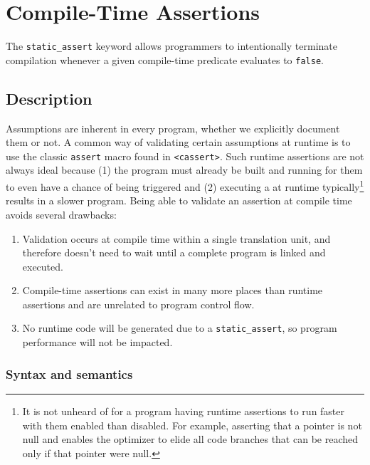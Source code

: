 \newpage
\section[{\tt static\_assert}]{Compile-Time Assertions}\label{compile-time-assertions-(static_assert)}



The \lstinline!static_assert! keyword allows programmers to intentionally terminate compilation whenever a given compile-time predicate
 evaluates to \lstinline!false!.

\subsection[Description]{Description}\label{description}

Assumptions are
inherent in every program, whether we explicitly document them or not. A common way of validating certain
assumptions at runtime is to use the classic \lstinline!assert! macro found
in \lstinline!<cassert>!. Such runtime assertions are not always ideal
because (1) the program must already be built and running for them to
even have a chance of being triggered and (2) executing a
 at runtime typically{\cprotect\footnote{It is
not unheard of for a program having runtime assertions to run faster with them
enabled than disabled. For example, asserting that a pointer is not
null and enables the optimizer to elide all code branches that
  can be reached only if that pointer were null.}} results in a slower
program. Being able to validate an assertion at compile time avoids
several drawbacks:

\begin{enumerate}
\item{Validation occurs at compile time within a single translation unit, and therefore doesn’t need to wait until a complete program is linked and executed.}
\item{Compile-time assertions can exist in many more places than runtime assertions and are unrelated to program control flow.}
\item{No runtime code will be generated due to a \lstinline!static_assert!, so program performance will not be impacted.}
\end{enumerate}

\subsubsection[Syntax and semantics]{Syntax and semantics}\label{syntax-and-semantics}

